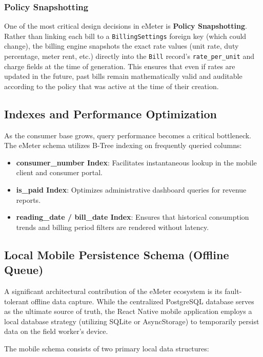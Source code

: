 \documentclass[12pt, a4paper, onecolumn]{report}
\begin{document}
\subsubsection{Policy Snapshotting}
One of the most critical design decisions in eMeter is \textbf{Policy Snapshotting}. Rather than linking each bill to a \texttt{BillingSettings} foreign key (which could change), the billing engine snapshots the exact rate values (unit rate, duty percentage, meter rent, etc.) directly into the \texttt{Bill} record's \texttt{rate\_per\_unit} and charge fields at the time of generation. This ensures that even if rates are updated in the future, past bills remain mathematically valid and auditable according to the policy that was active at the time of their creation.

\subsection{Indexes and Performance Optimization}
As the consumer base grows, query performance becomes a critical bottleneck. The eMeter schema utilizes B-Tree indexing on frequently queried columns:
\begin{itemize}
    \item \textbf{consumer\_number Index}: Facilitates instantaneous lookup in the mobile client and consumer portal.
    \item \textbf{is\_paid Index}: Optimizes administrative dashboard queries for revenue reports.
    \item \textbf{reading\_date / bill\_date Index}: Ensures that historical consumption trends and billing period filters are rendered without latency.
\end{itemize}

\subsection{Local Mobile Persistence Schema (Offline Queue)}
A significant architectural contribution of the eMeter ecosystem is its fault-tolerant offline data capture. While the centralized PostgreSQL database serves as the ultimate source of truth, the React Native mobile application employs a local database strategy (utilizing SQLite or AsyncStorage) to temporarily persist data on the field worker's device. 

The mobile schema consists of two primary local data structures:
\end{document}
